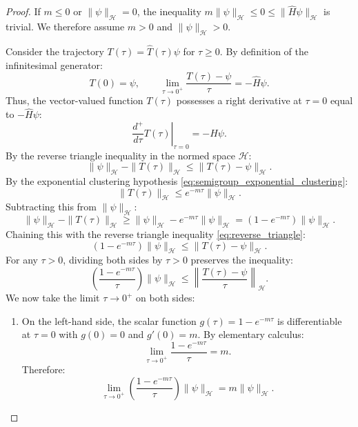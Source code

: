 \begin{proof}
If $m \le 0$ or $\|\psi\|_{\mathcal{H}} = 0$, the inequality $m \|\psi\|_{\mathcal{H}} \le 0 \le \|\hat{H}\psi\|_{\mathcal{H}}$ is trivial. We therefore assume $m > 0$ and $\|\psi\|_{\mathcal{H}} > 0$.

Consider the trajectory $T(\tau) = \hat{T}(\tau)\psi$ for $\tau \ge 0$. By definition of the infinitesimal generator:
\begin{equation}
T(0) = \psi, \qquad \lim_{\tau \to 0^+} \frac{T(\tau) - \psi}{\tau} = -\hat{H}\psi.
\end{equation}
Thus, the vector-valued function $T(\tau)$ possesses a right derivative at $\tau = 0$ equal to $-\hat{H}\psi$:
\begin{equation}
\label{eq:traj_derivative}
\left. \frac{d^+}{d\tau} T(\tau) \right|_{\tau = 0} = -\hat{H}\psi.
\end{equation}
By the reverse triangle inequality in the normed space $\mathcal{H}$:
\begin{equation}
\label{eq:reverse_triangle}
\|\psi\|_{\mathcal{H}} - \|T(\tau)\|_{\mathcal{H}} \le \|T(\tau) - \psi\|_{\mathcal{H}}.
\end{equation}
By the exponential clustering hypothesis \eqref{eq:semigroup_exponential_clustering}:
\begin{equation}
\|T(\tau)\|_{\mathcal{H}} \le e^{-m\tau} \|\psi\|_{\mathcal{H}}.
\end{equation}
Subtracting this from $\|\psi\|_{\mathcal{H}}$:
\begin{equation}
\|\psi\|_{\mathcal{H}} - \|T(\tau)\|_{\mathcal{H}} \ge \|\psi\|_{\mathcal{H}} - e^{-m\tau} \|\psi\|_{\mathcal{H}} = \left( 1 - e^{-m\tau} \right) \|\psi\|_{\mathcal{H}}.
\end{equation}
Chaining this with the reverse triangle inequality \eqref{eq:reverse_triangle}:
\begin{equation}
\label{eq:chained_ineq}
\left( 1 - e^{-m\tau} \right) \|\psi\|_{\mathcal{H}} \le \|T(\tau) - \psi\|_{\mathcal{H}}.
\end{equation}
For any $\tau > 0$, dividing both sides by $\tau > 0$ preserves the inequality:
\begin{equation}
\label{eq:difference_quotient_ineq}
\left( \frac{1 - e^{-m\tau}}{\tau} \right) \|\psi\|_{\mathcal{H}} \le \left\| \frac{T(\tau) - \psi}{\tau} \right\|_{\mathcal{H}}.
\end{equation}
We now take the limit $\tau \to 0^+$ on both sides:
\begin{enumerate}
    \item On the left-hand side, the scalar function $g(\tau) = 1 - e^{-m\tau}$ is differentiable at $\tau = 0$ with $g(0) = 0$ and $g'(0) = m$. By elementary calculus:
    \begin{equation}
    \lim_{\tau \to 0^+} \frac{1 - e^{-m\tau}}{\tau} = m.
    \end{equation}
    Therefore:
    \begin{equation}
    \lim_{\tau \to 0^+} \left( \frac{1 - e^{-m\tau}}{\tau} \right) \|\psi\|_{\mathcal{H}} = m \|\psi\|_{\mathcal{H}}.
    \end{equation}


\end{enumerate}
\end{proof}
